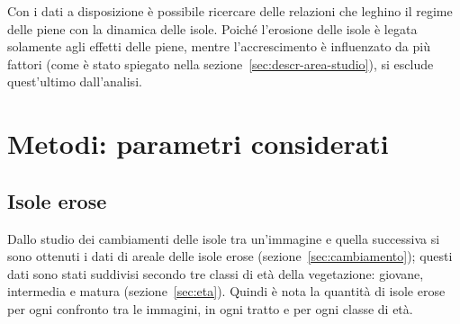 Con i dati a disposizione è possibile ricercare delle relazioni che leghino il regime delle piene con la dinamica delle isole.
Poiché l'erosione delle isole è legata solamente agli effetti delle piene, mentre l'accrescimento è influenzato da più fattori (come è stato spiegato nella sezione~\ref{sec:descr-area-studio}), si esclude quest'ultimo dall'analisi.

\section{Metodi: parametri considerati}

\subsection{Isole erose}
Dallo studio dei cambiamenti delle isole tra un'immagine e quella successiva si sono ottenuti i dati di areale delle isole erose (sezione~\ref{sec:cambiamento});
questi dati sono stati suddivisi secondo tre classi di età della vegetazione: giovane, intermedia e matura (sezione~\ref{sec:eta}).
Quindi è nota la quantità di isole erose per ogni confronto tra le immagini, in ogni tratto e per ogni classe di età.


